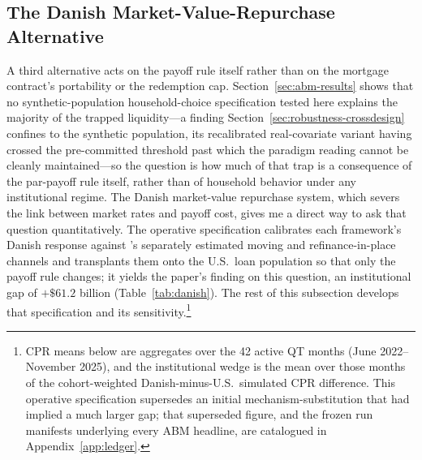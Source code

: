 \documentclass[12pt]{article}
\begin{document}
\subsection{The Danish Market-Value-Repurchase Alternative}\label{sec:abm-danish}

A third alternative acts on the payoff rule itself rather than on the mortgage contract's portability or the redemption cap. Section~\ref{sec:abm-results} shows that no synthetic-population household-choice specification tested here explains the majority of the trapped liquidity---a finding Section~\ref{sec:robustness-crossdesign} confines to the synthetic population, its recalibrated real-covariate variant having crossed the pre-committed threshold past which the paradigm reading cannot be cleanly maintained---so the question is how much of that trap is a consequence of the par-payoff rule itself, rather than of household behavior under any institutional regime. The Danish market-value repurchase system, which severs the link between market rates and payoff cost, gives me a direct way to ask that question quantitatively. The operative specification calibrates each framework's Danish response against \citet{berger2026}'s separately estimated moving and refinance-in-place channels and transplants them onto the U.S.\ loan population so that only the payoff rule changes; it yields the paper's finding on this question, an institutional gap of $+\$61.2$ billion (Table~\ref{tab:danish}). The rest of this subsection develops that specification and its sensitivity.\footnote{\label{fn:manifest}CPR means below are aggregates over the 42 active QT months (June 2022--November 2025), and the institutional wedge is the mean over those months of the cohort-weighted Danish-minus-U.S.\ simulated CPR difference. This operative specification supersedes an initial mechanism-substitution that had implied a much larger gap; that superseded figure, and the frozen run manifests underlying every ABM headline, are catalogued in Appendix~\ref{app:ledger}.}
\end{document}
